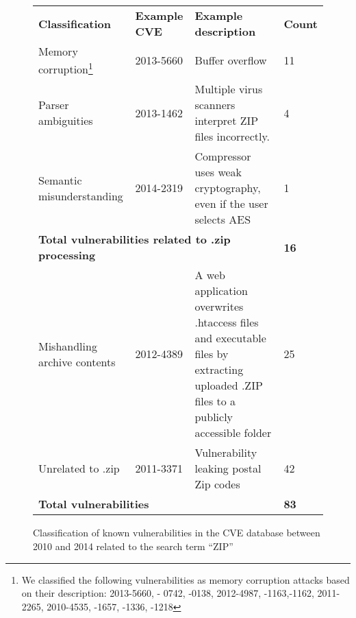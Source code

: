
\begin{figure*}
\begin{tabular}{@{}llll @{}}
 \bf Classification & \bf Example CVE & \bf Example description & \bf Count\\
  Memory corruption\footnote{We classified the following vulnerabilities as memory corruption
    attacks based on their description: 2013-5660, - 0742, -0138, 2012-4987, -1163,-1162, 2011-2265,
    2010-4535, -1657, -1336, -1218} & 2013-5660 & Buffer overflow & 11\\
  Parser ambiguities & 2013-1462 & Multiple virus scanners interpret ZIP files incorrectly.& 4\\
  Semantic misunderstanding & 2014-2319 & Compressor uses weak cryptography, even if the user
  selects AES & 1\\
  \multicolumn{3}{l}{\bf Total vulnerabilities related to .zip processing }& \bf 16  \\  
  Mishandling archive contents &  2012-4389 & 
\begin{minipage}{7cm}
A web application overwrites .htaccess files and
  executable files by extracting uploaded .ZIP files to a publicly accessible folder  
\end{minipage}& 25\\
   Unrelated to .zip &2011-3371& Vulnerability leaking postal Zip codes & 42\\
  \multicolumn{3}{l}{\bf Total vulnerabilities} & \bf 83\\ 
  
\end{tabular}
\caption{Classification of known vulnerabilities in the CVE database between 2010 and 2014 related to the search term ``ZIP''}
\label{fig:motivation} 
\end{figure*}